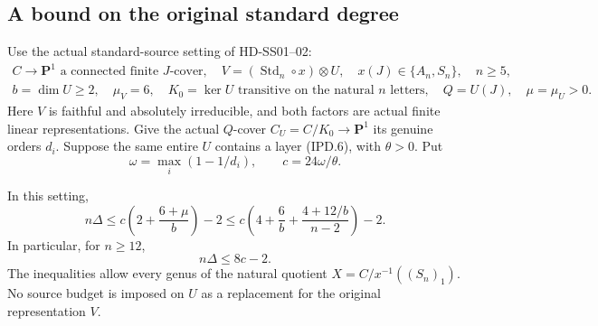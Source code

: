 \subsection*{A bound on the original standard degree}

Use the actual standard-source setting of HD-SS01--02:
\[
 \begin{gathered}
 C\longrightarrow\mathbf P^1\text{ a connected finite }J\text{-cover},
 \quad V=(\operatorname{Std}_n\circ x)\otimes U,
 \quad x(J)\in\{A_n,S_n\},\quad n\ge5,\\
 b=\dim U\ge2,\quad \mu_V=6,\quad
 K_0=\ker U\text{ transitive on the natural }n\text{ letters},
 \quad Q=U(J),\quad \mu=\mu_U>0.
 \end{gathered}
 \tag{IPD.9}
\]
Here \(V\) is faithful and absolutely irreducible, and both
factors are actual finite linear representations. Give the
actual \(Q\)-cover \(C_U=C/K_0\to\mathbf P^1\) its genuine
orders \(d_i\). Suppose the same entire \(U\) contains a layer
(IPD.6), with \(\theta>0\). Put
\[
 \omega=\max_i(1-1/d_i),\qquad c=24\omega/\theta.
 \tag{IPD.10}
\]

\begin{theorem}
In this setting,
\[
 n\Delta\le c\left(2+\frac{6+\mu}{b}\right)-2
 \le c\left(4+\frac6b+
                  \frac{4+12/b}{n-2}\right)-2.
 \tag{IPD.11}
\]
In particular, for \(n\ge12\),
\[
                         n\Delta\le8c-2.
 \tag{IPD.12}
\]
The inequalities allow every genus of the natural quotient
\(X=C/x^{-1}((S_n)_1)\). No source budget is imposed on \(U\)
as a replacement for the original representation \(V\).
\end{theorem}

